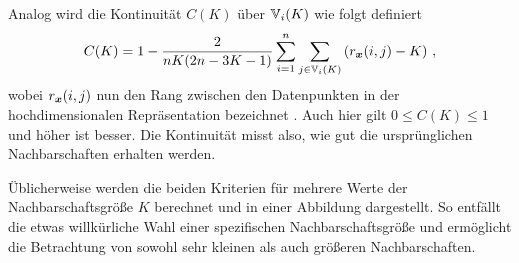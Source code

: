 Analog wird die Kontinuität $C(K)$ über $\mathbb{V}_i(K)$ wie folgt definiert
\begin{equation}
	C(K) = 1 - \frac{2}{nK(2n - 3K - 1)} \sum_{i = 1}^{n}\sum_{j \in \mathbb{V}_i(K) } \left( r_{\bm{x}}(i, j) - K \right) \, ,
\end{equation}
wobei $r_{\bm{x}}(i, j)$ nun den Rang zwischen den Datenpunkten in der hochdimensionalen Repräsentation bezeichnet \parencite[487]{Venna.2001}. Auch hier gilt $0 \leq C(K) \leq 1$ und höher ist besser. Die Kontinuität
misst also, wie gut die ursprünglichen Nachbarschaften erhalten werden.

Üblicherweise werden die beiden Kriterien für mehrere Werte der Nachbarschaftsgröße $K$ berechnet und in einer Abbildung dargestellt. So entfällt die etwas willkürliche Wahl einer spezifischen Nachbarschaftsgröße und ermöglicht die Betrachtung von sowohl sehr kleinen als auch größeren Nachbarschaften.

